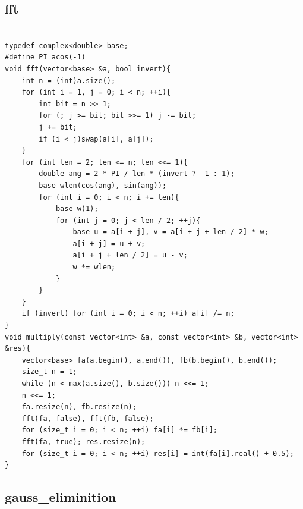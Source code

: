 \documentclass[9pt, landscape, a4paper,twosided]{extarticle}
\begin{document}
\begin{multicols*}{3}
\subsection{fft}
\begin{verbatim}

typedef complex<double> base;
#define PI acos(-1)
void fft(vector<base> &a, bool invert){
    int n = (int)a.size();
    for (int i = 1, j = 0; i < n; ++i){
        int bit = n >> 1;
        for (; j >= bit; bit >>= 1) j -= bit;
        j += bit;
        if (i < j)swap(a[i], a[j]);
    }
    for (int len = 2; len <= n; len <<= 1){
        double ang = 2 * PI / len * (invert ? -1 : 1);
        base wlen(cos(ang), sin(ang));
        for (int i = 0; i < n; i += len){
            base w(1);
            for (int j = 0; j < len / 2; ++j){
                base u = a[i + j], v = a[i + j + len / 2] * w;
                a[i + j] = u + v;
                a[i + j + len / 2] = u - v;
                w *= wlen;
            }
        }
    }
    if (invert) for (int i = 0; i < n; ++i) a[i] /= n;
}
void multiply(const vector<int> &a, const vector<int> &b, vector<int> &res){
    vector<base> fa(a.begin(), a.end()), fb(b.begin(), b.end());
    size_t n = 1;
    while (n < max(a.size(), b.size())) n <<= 1;
    n <<= 1;
    fa.resize(n), fb.resize(n);
    fft(fa, false), fft(fb, false);
    for (size_t i = 0; i < n; ++i) fa[i] *= fb[i];
    fft(fa, true); res.resize(n);
    for (size_t i = 0; i < n; ++i) res[i] = int(fa[i].real() + 0.5);
}
\end{verbatim}

\subsection{gauss\_eliminition}
\begin{verbatim}


\end{verbatim}
\end{multicols*}
\end{document}
